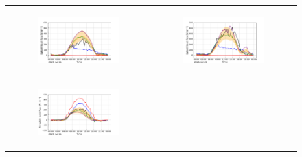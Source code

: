 \begin{figure}[hbtp]
    \centering
    \begin{tabular}{cc}
        \begin{subfigure}[t]{0.5\textwidth}
            \caption{}
            \includegraphics[width=\textwidth]{images/chap5/IOP_TS/TS_2021-07-15_cendrosa_flat.png}
        \end{subfigure} &
        \begin{subfigure}[t]{0.5\textwidth}
            \caption{}
            \includegraphics[width=\textwidth]{images/chap5/IOP_TS/TS_2021-07-20_cendrosa_flat.png}
        \end{subfigure} \\
        \begin{subfigure}[t]{0.5\textwidth}
            \caption{}
            \includegraphics[width=\textwidth]{images/chap5/IOP_TS/TS_2021-07-15_cendrosa_sens.png}

\end{subfigure}
\end{tabular}
\end{figure}
